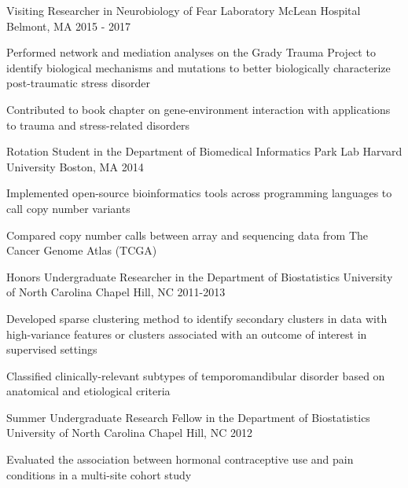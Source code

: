 \begin{cventries}
\cventry
{Visiting Researcher in Neurobiology of Fear Laboratory} %
{McLean Hospital} %
{Belmont, MA} %
{2015 - 2017} %
{
	\begin{cvitems} %
		\item {Performed network and mediation analyses on the Grady Trauma Project to identify biological mechanisms and mutations to better biologically characterize post-traumatic stress disorder}
		\item {Contributed to book chapter on gene-environment interaction with applications to trauma and stress-related disorders}
	\end{cvitems}
}

  \cventry
    {Rotation Student in the Department of Biomedical Informatics Park Lab} %
    {Harvard University} %
    {Boston, MA} %
    {2014} %
    {
      \begin{cvitems} %
        \item {Implemented open-source bioinformatics tools across programming languages to call copy number variants}
        \item {Compared copy number calls between array and sequencing data from The Cancer Genome Atlas (TCGA)}
      \end{cvitems}
    }

\cventry
{Honors Undergraduate Researcher in the Department of Biostatistics} %
{ University of North Carolina} %
{Chapel Hill, NC} %
{2011-2013} %
{
	\begin{cvitems} %
		\item {Developed sparse clustering method to identify secondary clusters in data with high-variance features or clusters associated with an outcome of interest in supervised settings}
		\item {Classified clinically-relevant subtypes of temporomandibular disorder based on anatomical and etiological criteria}
	\end{cvitems}
}

\cventry
{Summer Undergraduate Research Fellow in the Department of Biostatistics} %
{ University of North Carolina} %
{Chapel Hill, NC} %
{2012} %
{
	\begin{cvitems} %
		\item {Evaluated the association between hormonal contraceptive use and pain conditions in a multi-site cohort study}
	\end{cvitems}
}


\end{cventries}

